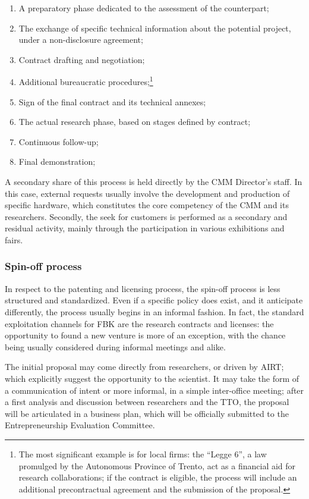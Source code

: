 \begin{enumerate}

\item A preparatory phase dedicated to the assessment of the counterpart;
\item The exchange of specific technical information about the potential project, under a non-disclosure agreement;
\item Contract drafting and negotiation;
\item Additional bureaucratic procedures;\footnote{The most significant example is for local firms: the \enquote{Legge 6}, a law promulged by the Autonomous Province of Trento, act as a financial aid for research collaborations; if the contract is eligible, the process will include an additional precontractual agreement and the submission of the proposal.}
\item Sign of the final contract and its technical annexes;
\item The actual research phase, based on stages defined by contract;
\item Continuous follow-up;
\item Final demonstration;

\end{enumerate}

A secondary share of this process is held directly by the CMM Director’s staff. In this case, external requests usually involve the development and production of specific hardware, which constitutes the core competency of the CMM and its researchers. Secondly, the seek for customers is performed as a secondary and residual activity, mainly through the participation in various exhibitions and fairs.

\subsubsection{Spin-off process}

In respect to the patenting and licensing process, the spin-off process is less structured and standardized. Even if a specific policy does exist, and it anticipate differently, the process usually begins in an informal fashion. In fact, the standard exploitation channels for FBK are the research contracts and licenses: the opportunity to found a new venture is more of an exception, with the chance being usually considered during informal meetings and alike.

The initial proposal may come directly from researchers, or driven by AIRT; which explicitly suggest the opportunity to the scientist. It may take the form of a communication of intent or more informal, in a simple inter-office meeting; after a first analysis and discussion between researchers and the TTO, the proposal will be articulated in a business plan, which will be officially submitted to the Entrepreneurship Evaluation Committee. 

